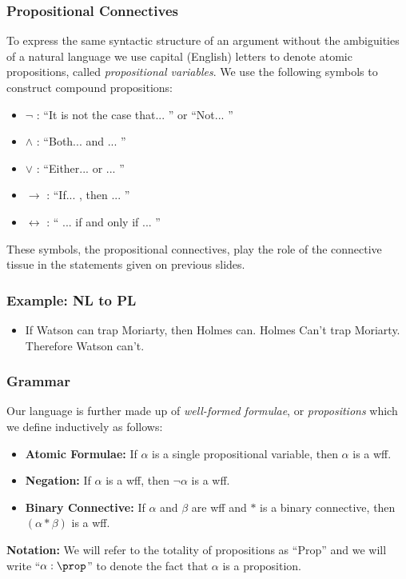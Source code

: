 \documentclass{beamer}
\begin{document}
\begin{frame}
	\frametitle{Propositional Connectives}
	
	To express the same syntactic structure of an argument without the ambiguities of a natural language we use capital (English) letters to denote atomic propositions, called \emph{propositional variables}. We use the following symbols to construct compound propositions: 
	
	\vspace{5mm}
	
	\begin{itemize}
		\item $\lnot$ : ``It is not the case that... '' or ``Not... ''
		\item $\land$ : ``Both... and ... '' 
		\item $\lor$ : ``Either... or ... ''
		\item $\rightarrow$ : ``If... , then ... ''
		\item $\leftrightarrow$ : `` ... if and only if ... ''
	\end{itemize}

	These symbols, the propositional connectives, play the role of the connective tissue in the statements given on previous slides. 
	
\end{frame}

\begin{frame}
	\frametitle{Example: NL to PL}
	\begin{itemize}
		\item If Watson can trap Moriarty, then Holmes can. Holmes Can't trap Moriarty. Therefore Watson can't.
	\end{itemize}
	
	\vspace{50mm}
	
	
\end{frame}	

\begin{frame}
	\frametitle{Grammar}
	
	Our language is further made up of \emph{well-formed formulae}, or \emph{propositions} which we define inductively as follows:

		\begin{itemize}
			\item {\bf Atomic Formulae:} If $\alpha$ is a single propositional variable, then $\alpha$ is a wff.
			\item {\bf Negation:} If $\alpha$ is a wff, then $\lnot\alpha$ is a wff. 
			\item {\bf Binary Connective:} If $\alpha$ and $\beta$ are wff and $*$ is a binary connective, then $(\alpha * \beta)$ is a wff. 		
		\end{itemize}
	
	\vspace{15mm}
	
	{\bf Notation:} We will refer to the totality of propositions as ``Prop'' and we will write ``$\alpha : \prop$'' to denote the fact that $\alpha$ is a proposition. 
	
\end{frame}
\end{document}
